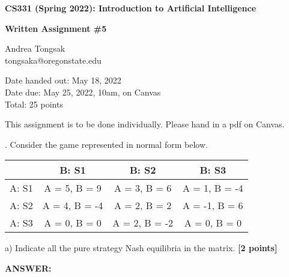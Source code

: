 \documentclass{article}
\begin{document}
\begin{center}
    \Large{\textbf{CS331 (Spring 2022): Introduction to Artificial Intelligence}}

   \Large{\textbf{ Written Assignment \#5}}
   
   \vspace{3mm}
   
   Andrea Tongsak \\ tongsaka@oregonstate.edu
\end{center}

\vspace{5mm} 

\noindent Date handed out: May 18, 2022 \\
\noindent Date due: May 25, 2022, 10am, on Canvas\\
\noindent Total: 25 points

\vspace{5mm} 

\noindent This assignment is to be done individually. Please hand in a pdf on Canvas. 

\vspace{5mm} 



.  Consider the game represented in normal form below. 


\vspace{3mm}

\begin{table*}[h]
    \centering
    \begin{tabular}{|c|c|c|c|}
    \hline
    & B: S1  & B: S2 & B: S3 \\
    \hline
    A: S1 & A = 5, B = 9 & A = 3, B = 6 & A = 1, B = -4 \\
    \hline
    A: S2 & A = 4, B = -4 &  A = 2, B = 2  & A = -1, B = 6 \\
    \hline
    A: S3  & A = 0, B = 0  & A = 2, B = -2  & A = 0, B = 0 \\
    \hline
    \end{tabular}
\end{table*}
\vspace{3mm}

\noindent a)  Indicate all the pure strategy Nash equilibria in the matrix. \textbf{[2 points]}

\vspace{3mm}

\noindent \textbf{ANSWER:}
\end{document}
